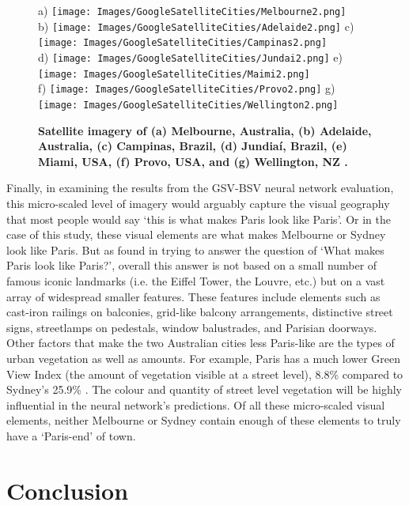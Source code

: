 \documentclass[10pt,letterpaper]{article}
\begin{document}
\begin{figure}[!htbp]
\centering    
a) \texttt{[image: Images/GoogleSatelliteCities/Melbourne2.png]} 
\\ b) \texttt{[image: Images/GoogleSatelliteCities/Adelaide2.png]} 
c) \texttt{[image: Images/GoogleSatelliteCities/Campinas2.png]} 
\\ d) \texttt{[image: Images/GoogleSatelliteCities/Jundai2.png]} 
e) \texttt{[image: Images/GoogleSatelliteCities/Maimi2.png]} 
\\ f) \texttt{[image: Images/GoogleSatelliteCities/Provo2.png]} 
g) \texttt{[image: Images/GoogleSatelliteCities/Wellington2.png]} 
 \caption{\bf Satellite imagery of (a) Melbourne, Australia, (b) Adelaide, Australia, (c) Campinas, Brazil, (d) Jundia\'{i}, Brazil, (e) Miami, USA, (f) Provo, USA, and (g) Wellington, NZ \cite{GoogleStatic2017}.}    
 \label{fig:satimages}  
\end{figure} 
Finally, in examining the results from the GSV-BSV neural network evaluation, this micro-scaled level of imagery would arguably capture the visual geography that most people would say `this is what makes Paris look like Paris'. Or in the case of this study, these visual elements are what makes Melbourne or Sydney look like Paris. But as \cite{Doersch2012} found in trying to answer the question of `What makes Paris look like Paris?', overall this answer is not based on a small number of famous iconic landmarks (i.e. the Eiffel Tower, the Louvre, etc.) but on a vast array of widespread smaller features. These features include elements such as cast-iron railings on balconies, grid-like balcony arrangements, distinctive street signs, streetlamps on pedestals, window balustrades, and Parisian doorways. Other factors that make the two Australian cities less Paris-like are the types of urban vegetation as well as amounts. For example, Paris has a much lower Green View Index (the amount of vegetation visible at a street level), 8.8\% compared to Sydney's 25.9\% \cite{Li2015}. The colour and quantity of street level vegetation will be highly influential in the neural network's predictions. Of all these micro-scaled visual elements, neither Melbourne or Sydney contain enough of these elements to truly have a `Paris-end' of town.



\section*{Conclusion}\label{sec:conclusion}
\end{document}
